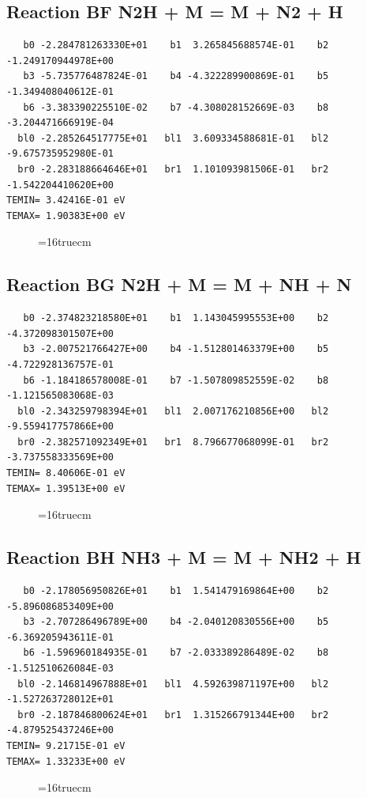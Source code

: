 \documentclass[12pt,dvipdfm]{article}
\begin{document}
\subsection{
Reaction BF N2H + M = M + N2 + H }
\begin{small}\begin{verbatim}
   b0 -2.284781263330E+01    b1  3.265845688574E-01    b2 -1.249170944978E+00
   b3 -5.735776487824E-01    b4 -4.322289900869E-01    b5 -1.349408040612E-01
   b6 -3.383390225510E-02    b7 -4.308028152669E-03    b8 -3.204471666919E-04
  bl0 -2.285264517775E+01   bl1  3.609334588681E-01   bl2 -9.675735952980E-01
  br0 -2.283188664646E+01   br1  1.101093981506E-01   br2 -1.542204410620E+00
TEMIN= 3.42416E-01 eV
TEMAX= 1.90383E+00 eV
   \end{verbatim}\end{small}
\begin{figure}[h!]
\label{n2rates}
\epsfxsize=16truecm
\end{figure}
\newpage

\subsection{
Reaction BG N2H + M = M + NH + N  }
\begin{small}\begin{verbatim}
   b0 -2.374823218580E+01    b1  1.143045995553E+00    b2 -4.372098301507E+00
   b3 -2.007521766427E+00    b4 -1.512801463379E+00    b5 -4.722928136757E-01
   b6 -1.184186578008E-01    b7 -1.507809852559E-02    b8 -1.121565083068E-03
  bl0 -2.343259798394E+01   bl1  2.007176210856E+00   bl2 -9.559417757866E+00
  br0 -2.382571092349E+01   br1  8.796677068099E-01   br2 -3.737558333569E+00
TEMIN= 8.40606E-01 eV
TEMAX= 1.39513E+00 eV
   \end{verbatim}\end{small}
\begin{figure}[h!]
\label{n2rates}
\epsfxsize=16truecm
\end{figure}
\newpage

\subsection{
Reaction BH NH3 + M = M + NH2 + H  }
\begin{small}\begin{verbatim}
   b0 -2.178056950826E+01    b1  1.541479169864E+00    b2 -5.896086853409E+00
   b3 -2.707286496789E+00    b4 -2.040120830556E+00    b5 -6.369205943611E-01
   b6 -1.596960184935E-01    b7 -2.033389286489E-02    b8 -1.512510626084E-03
  bl0 -2.146814967888E+01   bl1  4.592639871197E+00   bl2 -1.527263728012E+01
  br0 -2.187846800624E+01   br1  1.315266791344E+00   br2 -4.879525437246E+00
TEMIN= 9.21715E-01 eV
TEMAX= 1.33233E+00 eV
   \end{verbatim}\end{small}
\begin{figure}[h!]
\label{n2rates}
\epsfxsize=16truecm
\end{figure}
\newpage
\end{document}
